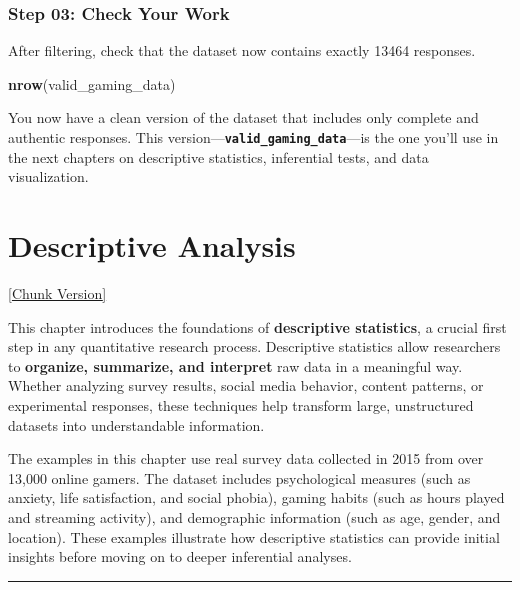 \documentclass[
]{book}
\newenvironment{Shaded}{\begin{snugshade}}{\end{snugshade}}
\newcommand{\FunctionTok}[1]{\textcolor[rgb]{0.13,0.29,0.53}{\textbf{#1}}}
\newcommand{\NormalTok}[1]{#1}
\begin{document}
\subsection*{Step 03: Check Your Work}\label{step-03-check-your-work}

After filtering, check that the dataset now contains exactly 13464 responses.

\begin{Shaded}
\begin{Highlighting}[]
\FunctionTok{nrow}\NormalTok{(valid\_gaming\_data)}
\end{Highlighting}
\end{Shaded}

You now have a clean version of the dataset that includes only complete and authentic responses. This version---\textbf{\texttt{valid\_gaming\_data}}---is the one you'll use in the next chapters on descriptive statistics, inferential tests, and data visualization.

\chapter{Descriptive Analysis}\label{descriptive-analysis}

\href{files/10-descriptive_stats-chunks.Rmd}{{[}Chunk Version{]}}

This chapter introduces the foundations of \textbf{descriptive statistics}, a crucial first step in any quantitative research process. Descriptive statistics allow researchers to \textbf{organize, summarize, and interpret} raw data in a meaningful way. Whether analyzing survey results, social media behavior, content patterns, or experimental responses, these techniques help transform large, unstructured datasets into understandable information.

The examples in this chapter use real survey data collected in 2015 from over 13,000 online gamers. The dataset includes psychological measures (such as anxiety, life satisfaction, and social phobia), gaming habits (such as hours played and streaming activity), and demographic information (such as age, gender, and location). These examples illustrate how descriptive statistics can provide initial insights before moving on to deeper inferential analyses.

\begin{center}\rule{0.5\linewidth}{0.5pt}\end{center}
\end{document}
